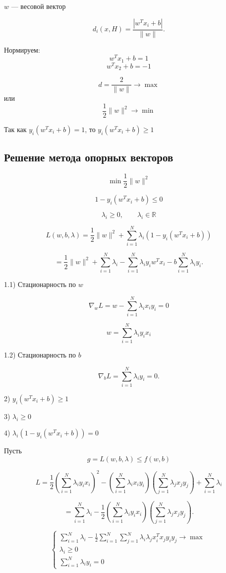 \documentclass[12pt,a4paper]{article}
\begin{document}
$w$ --- весовой вектор

\[
d_i(x,H)=\frac{|w^Tx_i+b|}{\|w\|}.
\]

Нормируем:
\[
w^Tx_1+b=1
\]
\[
w^Tx_2+b=-1
\]

\[
d=\frac{2}{\|w\|}\to\max
\]
или
\[
\frac12\|w\|^2\to\min
\]

Так как $y_i(w^Tx_i+b)=1$, то $y_i(w^Tx_i+b)\geq1$

\subsection{Решение метода опорных векторов}

\[
\min \frac{1}{2}\|w\|^2
\]

\[
1-y_i(w^Tx_i+b)\leq 0
\]

\[
\lambda_i\geq 0,\qquad \lambda_i\in\mathbb{R}
\]

\[
L(w,b,\lambda)
=
\frac{1}{2}\|w\|^2
+
\sum_{i=1}^{N}\lambda_i\left(1-y_i(w^Tx_i+b)\right)
\]

\[
=
\frac{1}{2}\|w\|^2
+
\sum_{i=1}^{N}\lambda_i
-
\sum_{i=1}^{N}\lambda_i y_i w^Tx_i
-
b\sum_{i=1}^{N}\lambda_i y_i.
\]

1.1) Стационарность по $w$

\[
\nabla_wL
=
w-\sum_{i=1}^{N}\lambda_i x_i y_i
=
0
\]

\[
w=\sum_{i=1}^{N}\lambda_i y_i x_i
\]

1.2) Стационарность по $b$

\[
\nabla_bL
=
\sum_{i=1}^{N}\lambda_i y_i
=
0.
\]

\medskip

2) $y_i(w^Tx_i+b)\geq 1$

\medskip

3) $\lambda_i\geq 0$

\medskip

4) $\lambda_i\left(1-y_i(w^Tx_i+b)\right)=0$

Пусть
\[
g=L(w,b,\lambda)\leq f(w,b)
\]

\[
L
=
\frac{1}{2}
\left(
\sum_{i=1}^{N}\lambda_i y_i x_i
\right)^2
-
\left(
\sum_{i=1}^{N}\lambda_i x_i y_i
\right)
\left(
\sum_{j=1}^{N}\lambda_j x_j y_j
\right)
+
\sum_{i=1}^{N}\lambda_i
\]

\[
=
\sum_{i=1}^{N}\lambda_i
-
\frac{1}{2}
\left(
\sum_{i=1}^{N}\lambda_i y_i x_i
\right)
\left(
\sum_{j=1}^{N}\lambda_j x_j y_j
\right).
\]

\[
\begin{cases}
\sum_{i=1}^{N}\lambda_i
-
\frac{1}{2}
\sum_{i=1}^{N}
\sum_{j=1}^{N}
\lambda_i\lambda_j x_i^Tx_jy_iy_j
\to\max\\[2mm]
\lambda_i\geq 0\\[2mm]
\displaystyle\sum_{i=1}^{N}\lambda_i y_i=0
\end{cases}
\]
\end{document}

